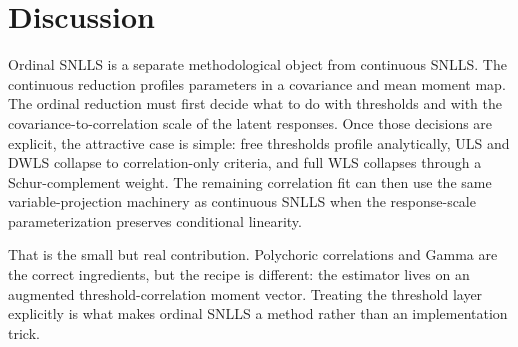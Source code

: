 \documentclass[11pt]{article}
\begin{document}
\section{Discussion}
\label{sec:discussion}

Ordinal SNLLS is a separate methodological object from continuous SNLLS. The
continuous reduction profiles parameters in a covariance and mean moment map.
The ordinal reduction must first decide what to do with thresholds and with
the covariance-to-correlation scale of the latent responses. Once those
decisions are explicit, the attractive case is simple: free thresholds profile
analytically, ULS and DWLS collapse to correlation-only criteria, and full WLS
collapses through a Schur-complement weight. The remaining correlation fit can
then use the same variable-projection machinery as continuous SNLLS when the
response-scale parameterization preserves conditional linearity.

That is the small but real contribution. Polychoric correlations and Gamma are
the correct ingredients, but the recipe is different: the estimator lives on an
augmented threshold-correlation moment vector. Treating the threshold layer
explicitly is what makes ordinal SNLLS a method rather than an implementation
trick.



\end{document}
